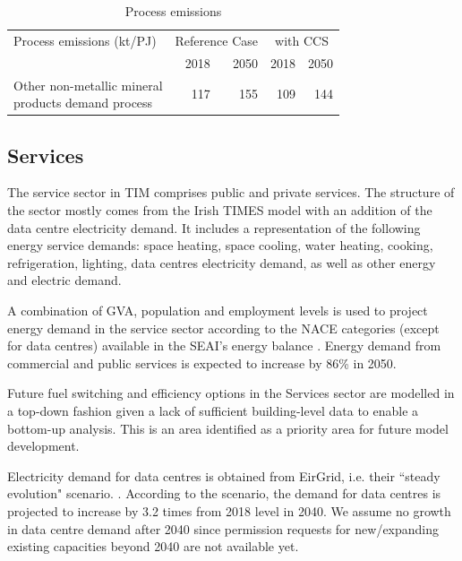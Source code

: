 \documentclass[journal abbreviation, manuscript]{copernicus}
\begin{document}


\begin{table}[htbp]
\footnotesize
 \centering
 \caption{Process emissions}
 \begin{tabular}{lrrrr}
 \hline
 Process emissions (kt/PJ) & \multicolumn{2}{c}{Reference Case} & \multicolumn{2}{c}{with CCS} \\
 & 2018 & 2050 & 2018 & 2050 \\ \hline
 \makecell{Other non-metallic mineral \\ products demand process} & 117 & 155 & 109 & 144 \\ \hline
 \end{tabular}%
 \label{tab:addlabel}%
\end{table}%


\subsection{Services}
\label{ss:services}
The service sector in TIM comprises public and private services. The structure of the sector mostly comes from the Irish TIMES model with an addition of the data centre electricity demand. It includes a representation of the following energy service demands: space heating, space cooling, water heating, cooking, refrigeration, lighting, data centres electricity demand, as well as other energy and electric demand.

A combination of GVA, population and employment levels is used to project energy demand in the service sector according to the NACE categories (except for data centres) available in the SEAI's energy balance \cite{SEAI2019}. Energy demand from commercial and public services is expected to increase by 86\% in 2050. 

Future fuel switching and efficiency options in the Services sector are modelled in a top-down fashion given a lack of sufficient building-level data to enable a bottom-up analysis. This is an area identified as a priority area for future model development. 

Electricity demand for data centres is obtained from EirGrid, i.e. their ``steady evolution" scenario. \cite{EirGridT57:online}. According to the scenario, the demand for data centres is projected to increase by 3.2 times from 2018 level in 2040. We assume no growth in data centre demand after 2040 since permission requests for new/expanding existing capacities beyond 2040 are not available yet. 
\end{document}
